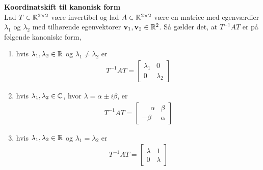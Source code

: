 \begin{thmx}\textbf{Koordinatskift til kanonisk form}\\
    Lad $T\in\mathbb{R}^{2\times 2}$ være invertibel og lad $A\in \mathbb{R}^{2\times 2}$ være en matrice med egenværdier $\lambda_1$ og $\lambda_2$ med tilhørende egenvektorer $\textbf{v}_1, \textbf{v}_2\in \mathbb{R}^2$. Så gælder det, at $T^{-1}AT$ er på følgende kanoniske form,
    
    
    \begin{enumerate}
        \item hvis $\lambda_1,\lambda_2 \in \mathbb{R}$ og $\lambda_1 \neq \lambda_2$ er 
        \begin{align*}
            T^{-1}AT = \begin{bmatrix}
                            \lambda_1   &  0\\
                            0           &  \lambda_2
                        \end{bmatrix}
        \end{align*}
        
        \item hvis $\lambda_1, \lambda_2 \in \mathbb{C}$, hvor $\lambda = \alpha \pm i \beta$, er
        \begin{align*}
            T^{-1}AT = \begin{bmatrix}
                            \phantom{-}\alpha &  \beta\\
                            - \beta           &  \alpha
                        \end{bmatrix}
        \end{align*}
        
        \item hvis $\lambda_1, \lambda_2 \in \mathbb{R}$ og $\lambda_1 = \lambda_2$ er 
        \begin{align*}
            T^{-1}AT = \begin{bmatrix}
                            \lambda   &  1\\
                            0           &  \lambda
                        \end{bmatrix}
        \end{align*}
    \end{enumerate}
\end{thmx}

\begin{bev}\textbf{}\\
    
\end{bev}
